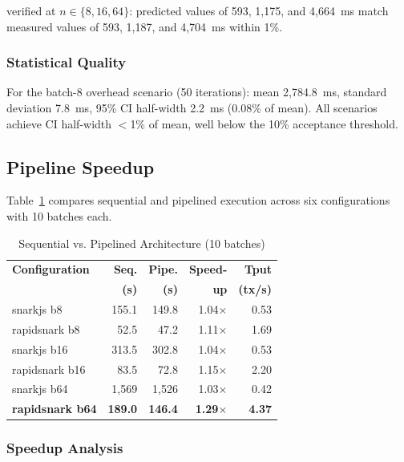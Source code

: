 \noindent verified at $n \in \{8, 16, 64\}$: predicted values of 593, 1,175,
and 4,664~ms match measured values of 593, 1,187, and 4,704~ms within 1\%.

\subsubsection{Statistical Quality}

For the batch-8 overhead scenario (50 iterations): mean 2,784.8~ms, standard
deviation 7.8~ms, 95\% CI half-width 2.2~ms (0.08\% of mean). All scenarios
achieve CI half-width $<$1\% of mean, well below the 10\% acceptance
threshold.

\subsection{Pipeline Speedup}

Table~\ref{tab:pipeline} compares sequential and pipelined execution across
six configurations with 10 batches each.

\begin{table}[htbp]
\centering
\caption{Sequential vs. Pipelined Architecture (10 batches)}
\label{tab:pipeline}
\begin{tabular}{lrrrr}
\toprule
\textbf{Configuration} & \textbf{Seq.} & \textbf{Pipe.} & \textbf{Speed-} & \textbf{Tput} \\
                        & \textbf{(s)}  & \textbf{(s)}   & \textbf{up}     & \textbf{(tx/s)} \\
\midrule
snarkjs b8             & 155.1 & 149.8 & 1.04$\times$ & 0.53 \\
rapidsnark b8          & 52.5  & 47.2  & 1.11$\times$ & 1.69 \\
snarkjs b16            & 313.5 & 302.8 & 1.04$\times$ & 0.53 \\
rapidsnark b16         & 83.5  & 72.8  & 1.15$\times$ & 2.20 \\
snarkjs b64            & 1,569 & 1,526 & 1.03$\times$ & 0.42 \\
\textbf{rapidsnark b64} & \textbf{189.0} & \textbf{146.4} & \textbf{1.29}$\times$ & \textbf{4.37} \\
\bottomrule
\end{tabular}
\end{table}

\subsubsection{Speedup Analysis}

